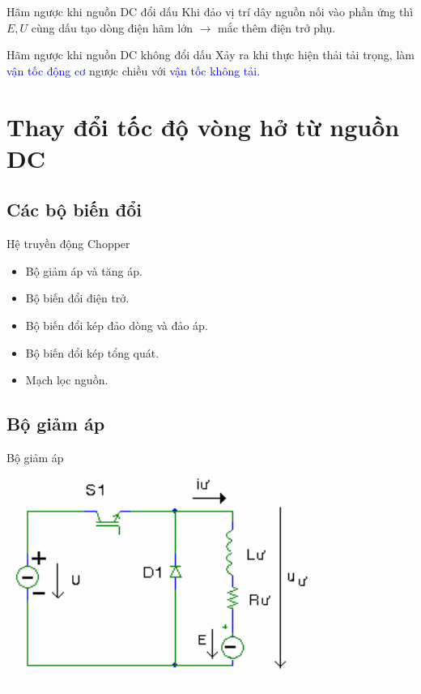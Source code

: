\documentclass[24pt]{beamer}
\begin{document}
\begin{frame}{Hãm ngược khi nguồn DC đổi dấu}
\justifying
Khi \alert{đảo vị trí dây nguồn} nối vào \alert{phần ứng} thì \alert{$E, U$ cùng dấu} tạo \alert{dòng điện hãm lớn} $\rightarrow$ \alert{mắc thêm điện trở phụ}.
\end{frame}

\begin{frame}{Hãm ngược khi nguồn DC không đổi dấu}
\justifying
Xảy ra khi thực hiện \alert{thải tải trọng}, làm \textcolor{blue}{vận tốc động cơ} \alert{ngược chiều} với \textcolor{blue}{vận tốc không tải}.
\end{frame}
\section[Hệ truyền động Chopper]{Thay đổi tốc độ vòng hở từ nguồn DC}
\subsection*{Các bộ biến đổi}
\begin{frame}{Hệ truyền động Chopper}
	\begin{itemize}
		\justifying
		\item Bộ giảm áp và tăng áp.
		\item Bộ biến đổi điện trở.		
		\item Bộ biến đổi kép đảo dòng và đảo áp.
		\item Bộ biến đổi kép tổng quát.
		\item Mạch lọc nguồn.
	\end{itemize}
\end{frame}
\subsection*{Bộ giảm áp}
\begin{frame}{Bộ giảm áp}
	\vspace{-.4cm}
	\begin{center}
		\includegraphics[scale=.7]{images-chude5/bo-giam-ap.png} 
	\end{center}
\end{frame}
\end{document}
